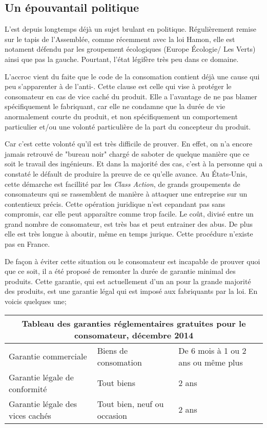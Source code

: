 \subsection{Un épouvantail politique}
L'\op est depuis longtemps déjà un sujet brulant en politique. Régulièrement remise sur le tapis de l'Assemblée, comme récemment avec la loi Hamon, elle est notament défendu par les groupement écologiques (Europe Écologie/ Les Verts) ainsi que pas la gauche.
Pourtant, l'état légifère très peu dans ce domaine.

\smallbreak L'accroc vient du faite que le code de la consomation contient déjà une cause qui peu s'apparenter à de l'anti-\op.
Cette clause est celle qui vise à protéger le consomateur en cas de vice caché du produit. 
Elle a l'avantage de ne pas blamer spécifiquement le fabriquant, car elle ne condamne que la durée de vie anormalement courte du produit, et non spécifiquement un comportement particulier et/ou une volonté particulière de la part du concepteur du produit.

\smallbreak Car c'est cette volonté qu'il est très difficile de prouver. En effet, on n'a encore jamais retrouvé de "bureau noir" chargé de saboter de quelque manière que ce soit le travail des ingénieurs. Et dans la majorité des cas, c'est à la personne qui a constaté le défault de produire la preuve de ce qu'elle avance.
Au États-Unis, cette démarche est facillité par les \textit{Class Action}, de grands groupements de consomateurs qui se rassemblent de manière à attaquer une entreprise sur un contentieux précis. Cette opération juridique n'est cepandant pas sans compromis, car elle peut apparaître comme trop facile.
Le coût, divisé entre un grand nombre de consomateur, est très bas et peut entrainer des abus.
De plus elle est très longue à aboutir, même en temps jurique.
Cette procédure n'existe pas en France.

\smallbreak De façon à éviter cette situation ou le consomateur est incapable de prouver quoi que ce soit, il a été proposé de remonter la durée de garantie minimal des produits. Cette garantie, qui est actuellement d'un an pour la grande majorité des produits, est une garantie légal qui est imposé aux fabriquants par la loi. 
En voicis quelques une;

\begin{center}
\begin{tabular}{|l|l|p{5cm}|}
  \hline
  \multicolumn{3}{|c|}{Tableau des garanties réglementaires gratuites pour le consomateur, décembre 2014} \\
	\hline Garantie commerciale & Biens de consomation & De 6 mois à 1 ou 2 ans ou même plus\\
	       Garantie légale de conformité & Tout biens & 2 ans \\
	       Garantie légale des vices cachés & Tout bien, neuf ou occasion & 2 ans \\
	\hline
\end{tabular}
\end{center}

